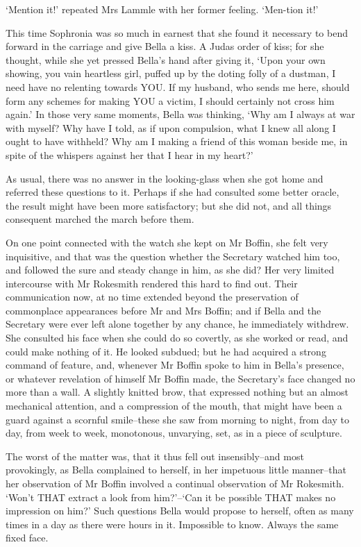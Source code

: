‘Mention it!’ repeated Mrs Lammle with her former feeling. ‘Men-tion
it!’

This time Sophronia was so much in earnest that she found it necessary
to bend forward in the carriage and give Bella a kiss. A Judas order of
kiss; for she thought, while she yet pressed Bella’s hand after giving
it, ‘Upon your own showing, you vain heartless girl, puffed up by the
doting folly of a dustman, I need have no relenting towards YOU. If my
husband, who sends me here, should form any schemes for making YOU a
victim, I should certainly not cross him again.’ In those very same
moments, Bella was thinking, ‘Why am I always at war with myself? Why
have I told, as if upon compulsion, what I knew all along I ought to
have withheld? Why am I making a friend of this woman beside me, in
spite of the whispers against her that I hear in my heart?’

As usual, there was no answer in the looking-glass when she got home and
referred these questions to it. Perhaps if she had consulted some better
oracle, the result might have been more satisfactory; but she did not,
and all things consequent marched the march before them.

On one point connected with the watch she kept on Mr Boffin, she felt
very inquisitive, and that was the question whether the Secretary
watched him too, and followed the sure and steady change in him, as she
did? Her very limited intercourse with Mr Rokesmith rendered this hard
to find out. Their communication now, at no time extended beyond the
preservation of commonplace appearances before Mr and Mrs Boffin; and if
Bella and the Secretary were ever left alone together by any chance,
he immediately withdrew. She consulted his face when she could do so
covertly, as she worked or read, and could make nothing of it. He looked
subdued; but he had acquired a strong command of feature, and, whenever
Mr Boffin spoke to him in Bella’s presence, or whatever revelation of
himself Mr Boffin made, the Secretary’s face changed no more than a
wall. A slightly knitted brow, that expressed nothing but an almost
mechanical attention, and a compression of the mouth, that might have
been a guard against a scornful smile--these she saw from morning to
night, from day to day, from week to week, monotonous, unvarying, set,
as in a piece of sculpture.

The worst of the matter was, that it thus fell out insensibly--and most
provokingly, as Bella complained to herself, in her impetuous little
manner--that her observation of Mr Boffin involved a continual
observation of Mr Rokesmith. ‘Won’t THAT extract a look from him?’--‘Can
it be possible THAT makes no impression on him?’ Such questions Bella
would propose to herself, often as many times in a day as there were
hours in it. Impossible to know. Always the same fixed face.

